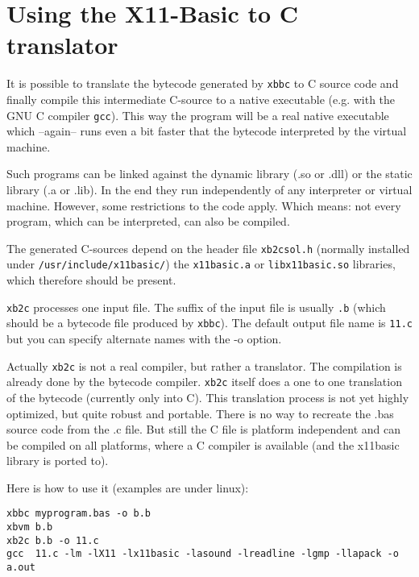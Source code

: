 \section{Using the X11-Basic to C translator}

It is possible to translate the bytecode generated by \verb|xbbc| to C source
code and finally compile this intermediate C-source to a native executable
(e.g. with the GNU C compiler \verb|gcc|). This way the program will be a real
native executable which  --again-- runs even a bit faster  that the bytecode
interpreted by the virtual machine. 

Such programs can be linked against the dynamic library (.so or .dll) or the
static library (.a or .lib). In the end they run independently of any
interpreter or virtual machine.   However, some restrictions to the code apply.
Which means: not every program, which can be interpreted, can also be compiled.

The generated C-sources depend on the header file \verb|xb2csol.h| (normally 
installed under \verb|/usr/include/x11basic/|) the \verb|x11basic.a|  or 
\verb|libx11basic.so| libraries, which therefore should be present.  

\verb|xb2c| processes one input file. The suffix of the input file is  usually
\verb|.b| (which should be a bytecode file produced by \verb|xbbc|). The default
output file name is \verb|11.c| but you can specify alternate names with the -o
option.

Actually \verb|xb2c| is not a real compiler, but rather a translator.  The
compilation is already done by the bytecode compiler. \verb|xb2c| itself does a
one to one translation of the bytecode (currently only into C).  This
translation process is not yet highly optimized, but quite robust and portable.
There is no way to recreate the .bas source code from the .c file.  But still
the C file is platform independent and can be compiled on all platforms, where a
C compiler is available (and the x11basic library is ported to).

Here is how to use it (examples are under linux):

\begin{mdframed}[hidealllines=true,backgroundcolor=black!20]
\begin{verbatim}
xbbc myprogram.bas -o b.b
xbvm b.b
xb2c b.b -o 11.c
gcc  11.c -lm -lX11 -lx11basic -lasound -lreadline -lgmp -llapack -o a.out
\end{verbatim}
\end{mdframed}

